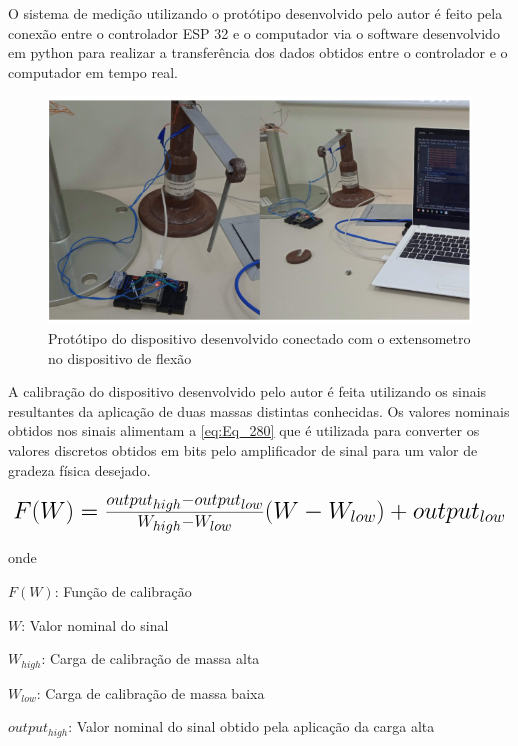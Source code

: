 O sistema de medição utilizando o protótipo desenvolvido pelo autor é feito pela conexão entre o controlador ESP 32 e o computador via o software desenvolvido em python
para realizar a transferência dos dados obtidos entre o controlador e o computador em tempo real.

\begin{figure}[htb]
	\caption{\label{fig:2070} Protótipo do dispositivo desenvolvido conectado com o extensometro no dispositivo de flexão}
	\begin{center}
		\includegraphics[width=\textwidth]{pictures/2070.png}
	\end{center}
\end{figure}

A calibração do dispositivo desenvolvido pelo autor é feita utilizando os sinais resultantes da aplicação de duas massas distintas conhecidas.
Os valores nominais obtidos nos sinais alimentam a \autoref{eq:Eq_280} que é utilizada para converter os valores discretos obtidos em bits pelo
amplificador de sinal para um valor de gradeza física desejado.

\begin{equation}\label{eq:Eq_280}%
\mbox{\fontsize{17.28}{21.6}\selectfont\( %
F(W) = \frac{output_{high}-output_{low}}{W_{high}-W_{low}}(W - W_{low}) + output_{low}
\)} %
\end{equation}

onde

$F(W)$: Função de calibração

$W$: Valor nominal do sinal

$W_{high}$: Carga de calibração de massa alta

$W_{low}$: Carga de calibração de massa baixa

$output_{high}$: Valor nominal do sinal obtido pela aplicação da carga alta

